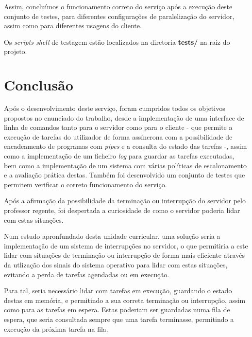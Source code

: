 \documentclass[a4paper,11pt]{scrreprt}
\begin{document}
\begin{minipage}{\textwidth}
    \vspace{1em}

    Assim, concluímos o funcionamento correto do serviço após a execução deste conjunto de testes,
    para diferentes configurações de paralelização do servidor, assim como para diferentes
    usagens do cliente.

    \vspace{1em}

    Os \textit{scripts shell} de testagem estão localizados na diretoria \textbf{tests/}
    na raiz do projeto.
\end{minipage}


\chapter{Conclusão}
    Após o desenvolvimento deste serviço, foram cumpridos todos
    os objetivos propostos no enunciado do trabalho, desde a implementação de
    uma interface de linha de comandos tanto para o servidor como para o cliente -
    que permite a execução de tarefas do utilizador de forma assíncrona com a
    possibilidade de encadeamento de programas com \textit{pipes} e a
    consulta do estado das tarefas -, assim como a implementação de um ficheiro
    \textit{log} para guardar as tarefas executadas, bem como a implementação de um
    sistema com várias políticas de escalonamento e a avaliação prática destas.
    Também foi desenvolvido um conjunto de testes que permitem verificar o correto
    funcionamento do serviço.

    Após a afirmação da possibilidade da terminação ou interrupção do servidor
    pelo professor regente, foi despertada a curiosidade de como o servidor
    poderia lidar com estas situações.

    Num estudo apronfundado desta unidade curricular, uma solução seria a
    implementação de um sistema de interrupções no servidor, o que permitiria
    a este lidar com situações de terminação ou interrupção de forma mais
    eficiente através da utlização dos sinais do sistema operativo para lidar com estas
    situações, evitando a perda de tarefas agendadas ou em execução.

    Para tal, seria necessário lidar com tarefas em execução, guardando
    o estado destas em memória, e permitindo a sua correta terminação
    ou interrupção, assim como para as tarefas em espera. Estas poderiam
    ser guardadas numa fila de espera, que seria consultada sempre que
    uma tarefa terminasse, permitindo a execução da próxima tarefa na
    fila.
\end{document}
